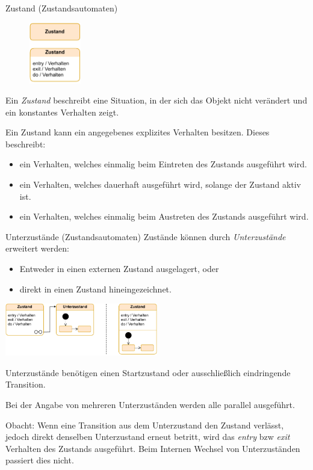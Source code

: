 \begin{diag}{Zustand (Zustandsautomaten)}
    \begin{figure}
        \centering
        \includegraphics[width=0.2\textwidth]{includes/figures/defi_diagrams_state.pdf}
    \end{figure}
    Ein \emph{Zustand} beschreibt eine Situation, in der sich das Objekt nicht verändert und ein konstantes Verhalten zeigt.

    Ein Zustand kann ein angegebenes explizites Verhalten besitzen.
    Dieses beschreibt:
    \begin{itemize}
        \item ein Verhalten, welches einmalig beim Eintreten des Zustands ausgeführt wird.
        \item ein Verhalten, welches dauerhaft ausgeführt wird, solange der Zustand aktiv ist.
        \item ein Verhalten, welches einmalig beim Austreten des Zustands ausgeführt wird.
    \end{itemize}
\end{diag}

\begin{diag}{Unterzustände (Zustandsautomaten)}
    Zustände können durch \emph{Unterzustände} erweitert werden:
    \begin{itemize}
        \item Entweder in einen externen Zustand ausgelagert, oder
        \item direkt in einen Zustand hineingezeichnet.
    \end{itemize}

    \begin{center}
        \includegraphics[width=0.5\textwidth]{includes/figures/defi_diagrams_state_substate.pdf}
    \end{center}

    Unterzustände benötigen einen Startzustand oder ausschließlich eindringende Transition.

    Bei der Angabe von mehreren Unterzuständen werden alle parallel ausgeführt.

    Obacht: Wenn eine Transition aus dem Unterzustand den Zustand verlässt, jedoch direkt denselben Unterzustand erneut betritt, wird das \emph{entry} bzw \emph{exit} Verhalten des Zustands ausgeführt.
    Beim Internen Wechsel von Unterzuständen passiert dies nicht.
\end{diag}

